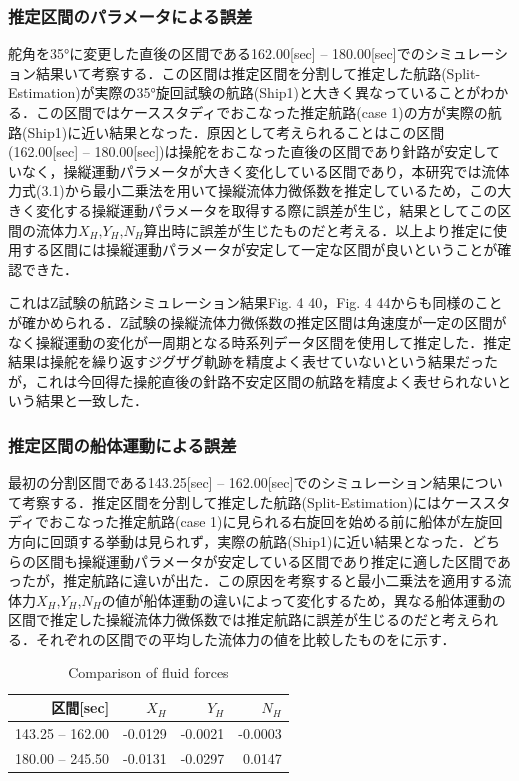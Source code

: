 \subsubsection{推定区間のパラメータによる誤差}
舵角を35°に変更した直後の区間である162.00[sec] – 180.00[sec]でのシミュレーション結果いて考察する．この区間は推定区間を分割して推定した航路(Split-Estimation)が実際の35°旋回試験の航路(Ship1)と大きく異なっていることがわかる．この区間ではケーススタディでおこなった推定航路(case 1)の方が実際の航路(Ship1)に近い結果となった．原因として考えられることはこの区間(162.00[sec] – 180.00[sec])は操舵をおこなった直後の区間であり針路が安定していなく，操縦運動パラメータが大きく変化している区間であり，本研究では流体力式(3.1)から最小二乗法を用いて操縦流体力微係数を推定しているため，この大きく変化する操縦運動パラメータを取得する際に誤差が生じ，結果としてこの区間の流体力$X_H$,$Y_H$,$N_H$算出時に誤差が生じたものだと考える．以上より推定に使用する区間には操縦運動パラメータが安定して一定な区間が良いということが確認できた．

これはZ試験の航路シミュレーション結果Fig. 4 40，Fig. 4 44からも同様のことが確かめられる．Z試験の操縦流体力微係数の推定区間は角速度が一定の区間がなく操縦運動の変化が一周期となる時系列データ区間を使用して推定した．推定結果は操舵を繰り返すジグザグ軌跡を精度よく表せていないという結果だったが，これは今回得た操舵直後の針路不安定区間の航路を精度よく表せられないという結果と一致した．

\subsubsection{推定区間の船体運動による誤差}

最初の分割区間である143.25[sec] – 162.00[sec]でのシミュレーション結果について考察する．推定区間を分割して推定した航路(Split-Estimation)にはケーススタディでおこなった推定航路(case 1)に見られる右旋回を始める前に船体が左旋回方向に回頭する挙動は見られず，実際の航路(Ship1)に近い結果となった．どちらの区間も操縦運動パラメータが安定している区間であり推定に適した区間であったが，推定航路に違いが出た．この原因を考察すると最小二乗法を適用する流体力$X_H$,$Y_H$,$N_H$の値が船体運動の違いによって変化するため，異なる船体運動の区間で推定した操縦流体力微係数では推定航路に誤差が生じるのだと考えられる．それぞれの区間での平均した流体力の値を比較したものをに示す．

\begin{table}[htbp]
 \caption{Comparison of fluid forces}
 \label{tb:5-2}
 \centering
  \begin{tabular}{rrrr}
   \hline
   区間[sec] & $X_H$ & $Y_H$ & $N_H$ \\
   \hline \hline
   143.25 – 162.00 & -0.0129 & -0.0021 & -0.0003 \\
   180.00 – 245.50 & -0.0131 & -0.0297 & 0.0147 \\
   \hline
  \end{tabular}
\end{table}

